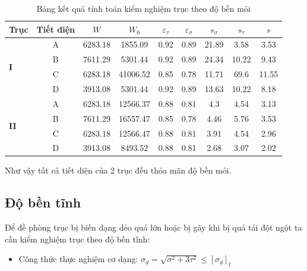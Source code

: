 \begin{center}
\begin{table}[H]
\centering
\begin{tabular}{|l|c|c|c|c|c|c|c|c|}
\hline
\textbf{Trục} & \textbf{Tiết diện} & $W$ & $ W_0 $ & $\varepsilon_\tau$ & $\varepsilon_\sigma$ & $s_\sigma$ & $s_\tau$ & $s$ \\
\hline
\multirow{4}{*}{\textbf{I}} & A & 6283.18 & 1855.09 & 0.92 & 0.89 & 21.89 & 3.58 & 3.53 \\
\cline{2-9}
& B & 7611.29 & 5301.44 & 0.92 & 0.89 & 24.34 & 10.22 & 9.43 \\
\cline{2-9}
& C & 6283.18 & 41006.52 & 0.85 & 0.78 & 11.71 & 69.6 & 11.55 \\
\cline{2-9}
& D & 3913.08 & 5301.44 & 0.92 & 0.89 & 13.63 & 10.22 & 8.18 \\
\hline
\multirow{4}{*}{\textbf{II}} & A & 6283.18 & 12566.37 & 0.88 & 0.81 & 4.3 & 4.54 & 3.13 \\
\cline{2-9}
& B & 7611.29 & 16557.47 & 0.85 & 0.78 & 4.46 & 5.76 & 3.53 \\
\cline{2-9}
& C & 6283.18 & 12566.47 & 0.88 & 0.81 & 3.91 & 4.54 & 2.96 \\
\cline{2-9}
& D & 3913.08 & 8493.52 & 0.88 & 0.81 & 2.68 & 3.07 & 2.02 \\
\hline
\end{tabular}
\caption{Bảng kết quả tính toán kiểm nghiệm trục theo độ bền mỏi}
\end{table}
\end{center}
Như vậy tất cả tiết diện của 2 trục đều thỏa mãn độ bền mỏi.
\subsection{Độ bền tĩnh}
Để đề phòng trục bị biến dạng dẻo quá lớn hoặc bị gãy khi bị quá tải đột ngột ta cần kiểm nghiệm trục theo độ bền tĩnh:

\begin{itemize}
    \item Công thức thực nghiệm cơ dạng: $\sigma_d = \sqrt{\sigma^2 + 3\tau^2} \leq [\sigma_d]_t$
\end{itemize}

